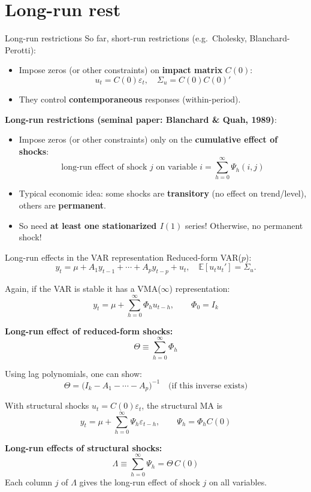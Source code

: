 \documentclass{beamer}
\begin{document}
\section{Long-run rest}

\begin{frame}{Long-run restrictions}
\small
So far, short-run restrictions (e.g.\ Cholesky, Blanchard-Perotti):
\begin{itemize}
  \item Impose zeros (or other constraints) on \textbf{impact matrix} $C(0)$:
  \[
  u_t = C(0)\varepsilon_t, \quad \Sigma_u = C(0)C(0)'
  \]
  \item They control \textbf{contemporaneous} responses (within-period).
\end{itemize}

\medskip
\textbf{Long-run restrictions (seminal paper: Blanchard \& Quah, 1989)}:
\begin{itemize}
  \item Impose zeros (or other constraints) only on the \textbf{cumulative effect of shocks}:
  \[
  \text{long-run effect of shock } j \text{ on variable } i
  = \sum_{h=0}^{\infty} \Psi_h(i,j)
  \]
  \item Typical economic idea: some shocks are \textbf{transitory} (no effect on trend/level), others are \textbf{permanent}. 
  \item So need \textbf{at least one stationarized $I(1)$} series! Otherwise, no permanent shock!
\end{itemize}
\end{frame}



\begin{frame}{Long-run effects in the VAR representation}
\tiny
Reduced-form VAR($p$):
\[
y_t = \mu + A_1 y_{t-1} + \cdots + A_p y_{t-p} + u_t,
\quad \mathbb{E}[u_t u_t'] = \Sigma_u.
\]

Again, if the VAR is stable it has a VMA($\infty$) representation:
\[
y_t = \mu + \sum_{h=0}^{\infty} \Phi_h u_{t-h}, \qquad \Phi_0 = I_k
\]

\medskip
\textbf{Long-run effect of reduced-form shocks:}
\[
\Theta \equiv \sum_{h=0}^{\infty} \Phi_h
\]

Using lag polynomials, one can show:
\[
\Theta = \big(I_k - A_1 - \cdots - A_p\big)^{-1}
\quad\text{(if this inverse exists)}
\]

\medskip
With structural shocks $u_t = C(0)\varepsilon_t$, the structural MA is
\[
y_t = \mu + \sum_{h=0}^{\infty} \Psi_h \varepsilon_{t-h},
\qquad \Psi_h = \Phi_h C(0)
\]

\textbf{Long-run effects of structural shocks:}
\[
\Lambda \equiv \sum_{h=0}^{\infty} \Psi_h = \Theta\, C(0)
\]
Each column $j$ of $\Lambda$ gives the long-run effect of shock $j$ on all variables.
\end{frame}
\end{document}
